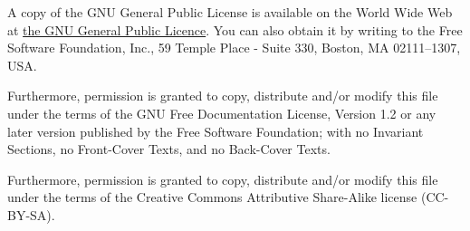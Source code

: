 \documentclass[12pt]{book}
\begin{document}
A copy of the GNU General Public License is available on the World
Wide Web at \href{http://www.gnu.org/copyleft/gpl.html}{the GNU
General Public Licence}. You can also obtain it by writing to the Free
Software Foundation, Inc., 59 Temple Place - Suite 330, Boston, MA
02111--1307, USA.


Furthermore, permission is granted to copy, distribute and/or modify
this file under the terms of the GNU Free Documentation License,
Version 1.2 or any later version published by the Free Software
Foundation; with no Invariant Sections, no Front-Cover Texts, and no
Back-Cover Texts.

Furthermore, permission is granted to copy, distribute and/or modify
this file under the terms of the Creative Commons Attributive
Share-Alike license (CC-BY-SA).


\printindex
\end{document}
